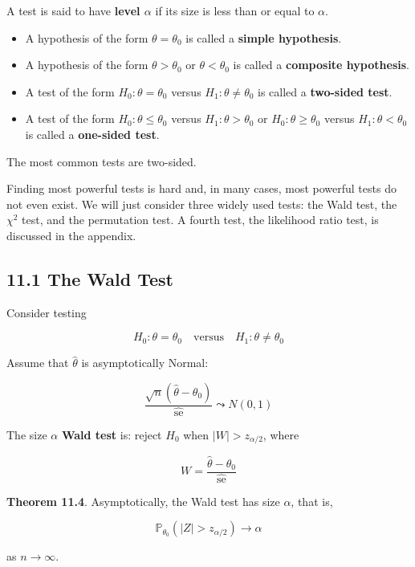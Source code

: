 A test is said to have \textbf{level \(\alpha\)} if its size is less
than or equal to \(\alpha\).

\begin{itemize}[tightlist]
\item
  A hypothesis of the form \(\theta = \theta_{0}\) is called a
  \textbf{simple hypothesis}.
\item
  A hypothesis of the form \(\theta > \theta_{0}\) or
  \(\theta < \theta_{0}\) is called a \textbf{composite hypothesis}.
\item
  A test of the form \(H_{0} : \theta = \theta_{0}\) versus
  \(H_{1} : \theta \neq \theta_{0}\) is called a \textbf{two-sided test}.
\item
  A test of the form \(H_{0} : \theta \leq \theta_{0}\) versus
  \(H_{1}: \theta > \theta_{0}\) or \(H_{0}: \theta \geq \theta_{0}\) versus
  \(H_{1}: \theta < \theta_{0}\) is called a \textbf{one-sided test}.
\end{itemize}

The most common tests are two-sided.

Finding most powerful tests is hard and, in many cases, most powerful
tests do not even exist. We will just consider three widely used tests:
the Wald test, the \(\chi^{2}\) test, and the permutation test. A fourth
test, the likelihood ratio test, is discussed in the appendix.

\subsection*{11.1 The Wald Test}\label{the-wald-test}

Consider testing

\[ H_{0}: \theta = \theta_{0}
\quad \text{versus} \quad
H_{1}: \theta \neq \theta_{0}\]

Assume that \(\hat{\theta}\) is asymptotically Normal:

\[ \frac{\sqrt{n}(\hat{\theta} - \theta_{0})}{\hat{\text{se}}} \leadsto N(0, 1) \]

The size \(\alpha\) \textbf{Wald test} is: reject \(H_{0}\) when
\(|W| > z_{\alpha/2}\), where

\[ W = \frac{\hat{\theta} - \theta_{0}}{\hat{\text{se}}}\]

\textbf{Theorem 11.4}. Asymptotically, the Wald test has size
\(\alpha\), that is,

\[ \mathbb{P}_{\theta_{0}} \left(|Z| > z_{\alpha/2} \right) \rightarrow \alpha\]

as \(n \rightarrow \infty\).

